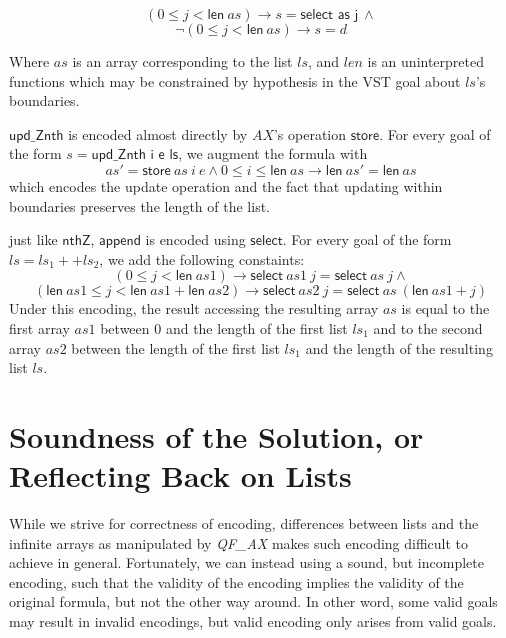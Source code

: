 \documentclass[onecolumn, preprint]{sigplanconf}
\begin{document}
$$ (0 \leq j < \textsf{len}\ as) \to s = \textsf{select as j}\ \wedge$$
$$\neg (0 \leq j < \textsf{len}\ as) \to s = d $$

Where $as$ is an array corresponding to the list $ls$, and $len$ is an uninterpreted functions which may be constrained by hypothesis in the VST goal about $ls$'s boundaries.


$\textsf{upd\_Znth}$ is encoded almost directly by $AX$'s operation $\textsf{store}$. For every goal of the form $s = \textsf{upd\_Znth\ i\ e\ ls}$, we augment the formula with
$$ as' = \textsf{store}\ as\ i\ e \wedge 0 \leq i \leq \textsf{len}\ as \to \textsf{len}\ as' = \textsf{len}\ as$$
which encodes the update operation and the fact that updating within boundaries preserves the length of the list.


just like $\textsf{nthZ}$, $\textsf{append}$ is encoded using $\textsf{select}$. For every goal of the form $ls = ls_1 ++ ls_2$, we add the following constaints:
$$(0 \leq j < \textsf{len}\ as1) \to \textsf{select}\ as1\ j = \textsf{select}\ as\ j \wedge $$
$$(\textsf{len}\ as1 \leq j < \textsf{len}\ as1 + \textsf{len}\ as2) \to \textsf{select}\ as2\ j = \textsf{select}\ as\ (\textsf{len}\ as1 + j)$$
Under this encoding, the result accessing the resulting array $as$ is equal to the first array $as1$ between $0$ and the length of the first list $ls_1$ and to the second array $as2$ between the length of the first list $ls_1$ and the length of the resulting list $ls$.




\section{Soundness of the Solution, or Reflecting Back on Lists}
While we strive for correctness of encoding, differences between lists
and the infinite arrays as manipulated by \emph{QF\_AX} makes such encoding difficult to achieve in general. 
Fortunately, we can instead using a sound, but incomplete encoding, such that the validity 
of the encoding implies the validity of the original formula, but not the other way around.
In other word, some valid goals may result in invalid encodings, but valid encoding only arises from valid goals.




\end{document}
